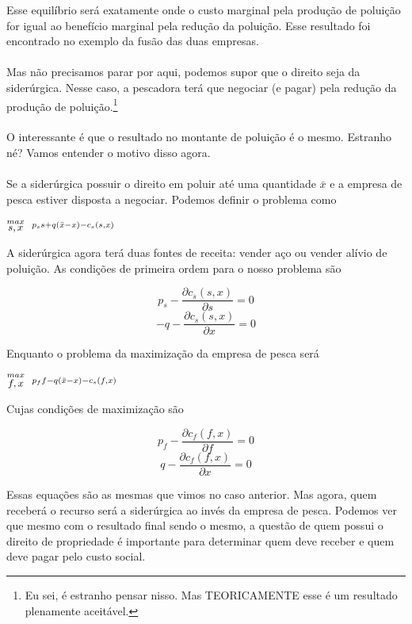 \documentclass[a4paper,11pt,oneside]{book}
\theoremstyle{definition}
\theoremstyle{break}
\begin{document}
Esse equilíbrio será exatamente onde o custo marginal pela produção de poluição for igual ao benefício marginal pela redução da poluição. Esse resultado foi encontrado no exemplo da fusão das duas empresas.
\\
\\
Mas não precisamos parar por aqui, podemos supor que o direito seja da siderúrgica. Nesse caso, a pescadora terá que negociar (e pagar) pela redução da produção de poluição.\footnote{Eu sei, é estranho pensar nisso. Mas TEORICAMENTE esse é um resultado plenamente aceitável.}
\\
\\
O interessante é que o resultado no montante de poluição é o mesmo. Estranho né? Vamos entender o motivo disso agora.
\\
\\
Se a siderúrgica possuir o direito em poluir até uma quantidade $\bar{x}$ e a empresa de pesca estiver disposta a negociar. Podemos definir o problema como

\begin{center}
	\LARGE $ \stackrel{max}{\text{\small $s,x$}} \ \ %
	\stackrel{p_ss + q(\bar{x} - x) - c_s(s,x)}{\ } $ %
\end{center}

A siderúrgica agora terá duas fontes de receita: vender aço ou vender alívio de poluição. As condições de primeira ordem para o nosso problema são

$$ p_s - \frac{\partial c_s(s,x)}{\partial s} = 0 $$
$$ -q - \frac{\partial c_s(s,x)}{\partial x} = 0 $$

Enquanto o problema da maximização da empresa de pesca será

\begin{center}
	\LARGE $ \stackrel{max}{\text{\small $f,x$}} \ \ %
	\stackrel{p_ff - q(\bar{x} - x) - c_s(f,x)}{\ } $ %
\end{center}

Cujas condições de maximização são

$$ p_f - \frac{\partial c_f(f,x)}{\partial f} = 0 $$
$$ q - \frac{\partial c_f(f,x)}{\partial x} = 0 $$

Essas equações são as mesmas que vimos no caso anterior. Mas agora, quem receberá o recurso será a siderúrgica ao invés da empresa de pesca. Podemos ver que mesmo com o resultado final sendo o mesmo, a questão de quem possui o direito de propriedade é importante para determinar quem deve receber e quem deve pagar pelo custo social.
\end{document}
